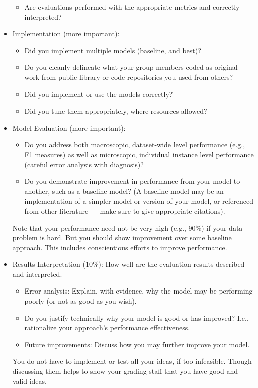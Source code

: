 \documentclass[11pt]{article}
\begin{document}
\begin{itemize}
\begin{itemize}
        \item Are evaluations performed with the appropriate metrics and correctly interpreted?
    \end{itemize}
    \item Implementation (more important): 
    \begin{itemize}
        \item Did you implement multiple models (baseline, and best)?  
        \item Do you cleanly delineate what your group members coded as original work from public library or code repositories you used from others?
        \item Did you implement or use the models correctly? 
        \item Did you tune them appropriately, where resources allowed?
    \end{itemize}
    \item Model Evaluation (more important): 
    \begin{itemize}
        \item Do you address both macroscopic, dataset-wide level performance (e.g., F1 measures) as well as microscopic, individual instance level performance (careful error analysis with diagnosis)?
        \item Do you demonstrate improvement in performance from your model to another, such as a baseline model? (A baseline model may be an implementation of a simpler model or version of your model, or referenced from other literature --- make sure to give appropriate citations). 
    \end{itemize}
    Note that your performance need not be very high (e.g., 90\%) if your data problem is hard. But you should show improvement over some baseline approach. This includes conscientious efforts to improve performance.
    \item Results Interpretation (10\%): How well are the evaluation results described and interpreted. 

    \begin{itemize}
        \item Error analysis: Explain, with evidence, why the model may be performing poorly (or not as good as you wish).  
        \item Do you justify technically why your model is good or has improved?  I.e., rationalize your approach’s performance effectiveness. 
        \item Future improvements: Discuss how you may further improve your model. 
    \end{itemize}
    You do not have to implement or test all your ideas, if too infeasible. Though discussing them helps to show your grading staff that you have good and valid ideas.
\end{itemize}
\end{document}
